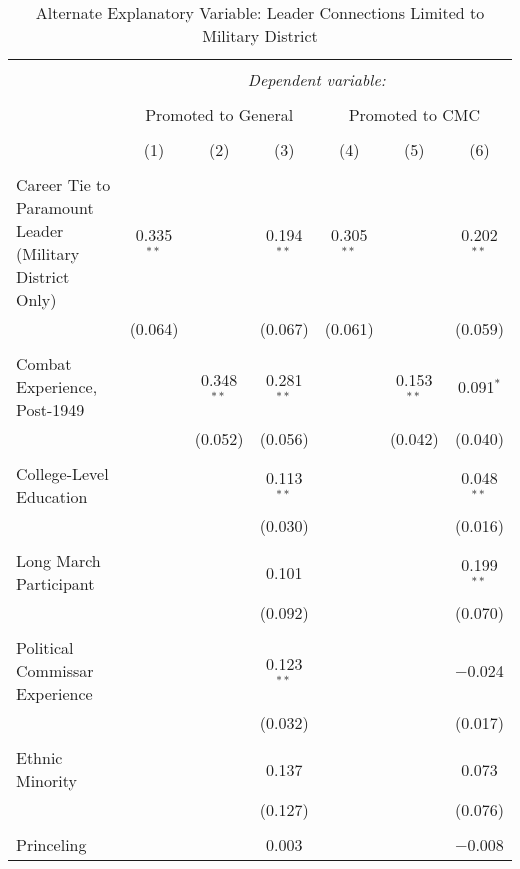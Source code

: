 
\begin{table}[!htbp] \centering 
  \caption{Alternate Explanatory Variable: Leader Connections Limited to Military District} 
  \label{table_a5} 
\begin{tabular}{@{\extracolsep{5pt}}lcccccc} 
\\[-1.8ex]\hline 
\hline \\[-1.8ex] 
 & \multicolumn{6}{c}{\textit{Dependent variable:}} \\ 
\cline{2-7} 
\\[-1.8ex] & \multicolumn{3}{c}{Promoted to General} & \multicolumn{3}{c}{Promoted to CMC} \\ 
\\[-1.8ex] & (1) & (2) & (3) & (4) & (5) & (6)\\ 
\hline \\[-1.8ex] 
 Career Tie to Paramount Leader (Military District Only) & 0.335$^{**}$ &  & 0.194$^{**}$ & 0.305$^{**}$ &  & 0.202$^{**}$ \\ 
  & (0.064) &  & (0.067) & (0.061) &  & (0.059) \\ 
  & & & & & & \\ 
 Combat Experience, Post-1949 &  & 0.348$^{**}$ & 0.281$^{**}$ &  & 0.153$^{**}$ & 0.091$^{*}$ \\ 
  &  & (0.052) & (0.056) &  & (0.042) & (0.040) \\ 
  & & & & & & \\ 
 College-Level Education &  &  & 0.113$^{**}$ &  &  & 0.048$^{**}$ \\ 
  &  &  & (0.030) &  &  & (0.016) \\ 
  & & & & & & \\ 
 Long March Participant &  &  & 0.101 &  &  & 0.199$^{**}$ \\ 
  &  &  & (0.092) &  &  & (0.070) \\ 
  & & & & & & \\ 
 Political Commissar Experience &  &  & 0.123$^{**}$ &  &  & $-$0.024 \\ 
  &  &  & (0.032) &  &  & (0.017) \\ 
  & & & & & & \\ 
 Ethnic Minority &  &  & 0.137 &  &  & 0.073 \\ 
  &  &  & (0.127) &  &  & (0.076) \\ 
  & & & & & & \\ 
 Princeling &  &  & 0.003 &  &  & $-$0.008 \\ 

\end{tabular}
\end{table}
